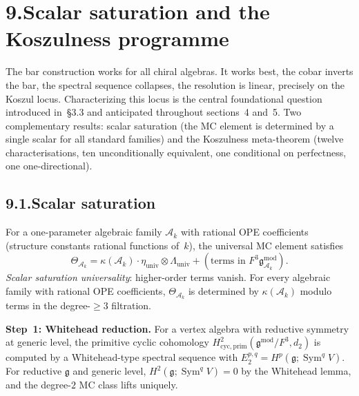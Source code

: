 \documentclass[11pt,reqno]{amsart}
\theoremstyle{definition}
\theoremstyle{remark}
\providecommand{\cA}{\mathcal{A}}
\numberwithin{equation}{section}
\begin{document}


\section*{9.\quad Scalar saturation and the Koszulness programme}

The bar construction works for all chiral algebras. It works best,
the cobar inverts the bar, the spectral sequence collapses, the
resolution is linear, precisely on the Koszul locus. Characterizing
this locus is the central foundational question introduced in~\S3.3
and anticipated throughout sections~4 and~5. Two complementary
results: scalar saturation (the MC element is determined by a single
scalar for all standard families) and the Koszulness meta-theorem
(twelve characterisations, ten unconditionally equivalent, one
conditional on perfectness, one one-directional).

\subsection*{9.1.\enspace Scalar saturation}

For a one-parameter algebraic family $\cA_k$ with rational OPE
coefficients (structure constants rational functions of~$k$), the
universal MC element satisfies
\[
\Theta_{\cA_k}=\kappa(\cA_k)\cdot\eta_{\mathrm{univ}}\otimes\Lambda_{\mathrm{univ}}+(\text{terms in }F^3\mathfrak g^{\mathrm{mod}}_{\cA_k}).
\]
\emph{Scalar saturation universality}: higher-order terms vanish. For
every algebraic family with rational OPE coefficients, $\Theta_{\cA_k}$
is determined by $\kappa(\cA_k)$ modulo terms in the degree-$\ge 3$
filtration.

\medskip
\noindent\textbf{Step~1: Whitehead reduction.}\enspace
For a vertex algebra with reductive symmetry at generic level, the
primitive cyclic cohomology
$H^2_{\mathrm{cyc,prim}}(\mathfrak g^{\mathrm{mod}}/F^3,d_2)$ is
computed by a Whitehead-type spectral sequence with
$E_2^{p,q}=H^p(\mathfrak g;\operatorname{Sym}^q V)$. For reductive
$\mathfrak g$ and generic level, $H^2(\mathfrak g;\operatorname{Sym}^q V)=0$
by the Whitehead lemma, and the degree-$2$ MC class lifts uniquely.
\end{document}
